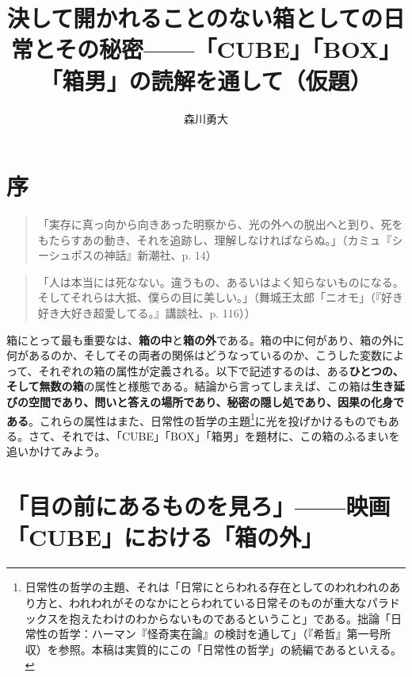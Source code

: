 \documentclass[a4paper]{jsarticle}
\begin{document}
\title{決して開かれることのない箱としての日常とその秘密------「CUBE」「BOX」「箱男」の読解を通して（仮題）}

\author{森川勇大}

\date{}

\maketitle

\tableofcontents

\section{序}

\begin{quotation}
「実存に真っ向から向きあった明察から、光の外への脱出へと到り、死をもたらすあの動き、それを追跡し、理解しなければならぬ。」（カミュ『シーシュポスの神話』新潮社、p. 14）
\end{quotation}

\begin{quotation}
「人は本当には死なない。違うもの、あるいはよく知らないものになる。そしてそれらは大抵、僕らの目に美しい。」（舞城王太郎「ニオモ」（『好き好き大好き超愛してる。』講談社、p. 116））
\end{quotation}

箱にとって最も重要なは、\textbf{箱の中}と\textbf{箱の外}である。箱の中に何があり、箱の外に何があるのか、そしてその両者の関係はどうなっているのか、こうした変数によって、それぞれの箱の属性が定義される。以下で記述するのは、ある\textbf{ひとつの、そして無数の箱}の属性と様態である。結論から言ってしまえば、この箱は\textbf{生き延びの空間であり、問いと答えの場所であり、秘密の隠し処であり、因果の化身である}。これらの属性はまた、日常性の哲学の主題\footnote{日常性の哲学の主題、それは「日常にとらわれる存在としてのわれわれのあり方と、われわれがそのなかにとらわれている日常そのものが重大なパラドックスを抱えたわけのわからないものであるということ」である。拙論「日常性の哲学：ハーマン『怪奇実在論』の検討を通して」（『希哲』第一号所収）を参照。本稿は実質的にこの「日常性の哲学」の続編であるといえる。}に光を投げかけるものでもある。さて、それでは、「CUBE」「BOX」「箱男」を題材に、この箱のふるまいを追いかけてみよう。

\section{「目の前にあるものを見ろ」------映画「CUBE」における「箱の外」}
\end{document}
